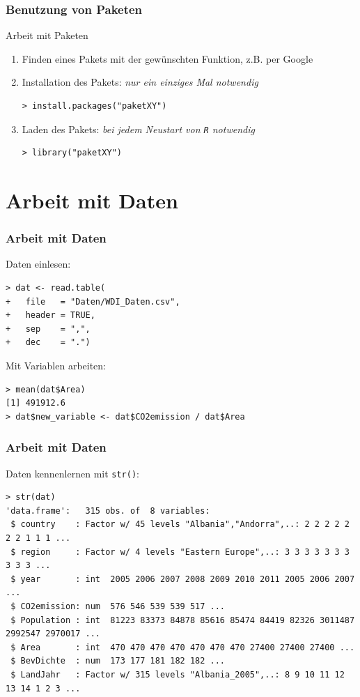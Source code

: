 \documentclass[xcolor=dvipsnames,class=article,a4paper]{beamer}
\begin{document}
\begin{frame}[fragile]
\frametitle{Benutzung von Paketen}
Arbeit mit Paketen
\begin{enumerate}
  \item Finden eines Pakets mit der gewünschten Funktion, z.B. per Google
  \item Installation des Pakets: \textit{nur ein einziges Mal notwendig}
  \begin{lstlisting}
> install.packages("paketXY")
  \end{lstlisting}  
  \item Laden des Pakets: \textit{bei jedem Neustart von \texttt{R} notwendig}
  \begin{lstlisting}
> library("paketXY")  
  \end{lstlisting}
\end{enumerate}
\end{frame}


\section{Arbeit mit Daten}
\addtocounter{framenumber}{-1}

\begin{frame}[fragile]
\frametitle{Arbeit mit Daten}
Daten einlesen:
\begin{lstlisting}
> dat <- read.table(
+   file   = "Daten/WDI_Daten.csv",
+   header = TRUE,
+   sep    = ",",
+   dec    = ".")
\end{lstlisting}
\bigskip \bigskip
Mit Variablen arbeiten:
\begin{lstlisting}
> mean(dat$Area)
[1] 491912.6
> dat$new_variable <- dat$CO2emission / dat$Area
\end{lstlisting}
\end{frame}

\begin{frame}[fragile]
\frametitle{Arbeit mit Daten}
Daten kennenlernen mit \texttt{str()}:
\begin{lstlisting}
> str(dat)
'data.frame':	315 obs. of  8 variables:
 $ country    : Factor w/ 45 levels "Albania","Andorra",..: 2 2 2 2 2 2 2 1 1 1 ...
 $ region     : Factor w/ 4 levels "Eastern Europe",..: 3 3 3 3 3 3 3 3 3 3 ...
 $ year       : int  2005 2006 2007 2008 2009 2010 2011 2005 2006 2007 ...
 $ CO2emission: num  576 546 539 539 517 ...
 $ Population : int  81223 83373 84878 85616 85474 84419 82326 3011487 2992547 2970017 ...
 $ Area       : int  470 470 470 470 470 470 470 27400 27400 27400 ...
 $ BevDichte  : num  173 177 181 182 182 ...
 $ LandJahr   : Factor w/ 315 levels "Albania_2005",..: 8 9 10 11 12 13 14 1 2 3 ...
\end{lstlisting}
\end{frame}
\end{document}
